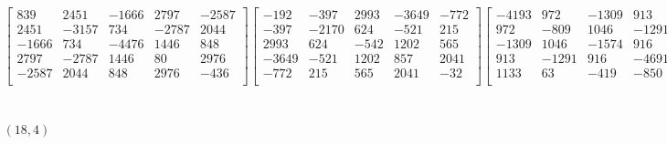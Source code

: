\documentclass[12pt]{amsart}
\theoremstyle{plain}
\theoremstyle{definition}
\begin{document}
\begin{landscape}
\begin{align*}
\begin{bmatrix}
839  &   2451  &   -1666  &   2797  &   -2587  \\ 
 2451  &   -3157  &   734  &   -2787  &   2044  \\ 
 -1666  &   734  &   -4476  &   1446  &   848  \\ 
 2797  &   -2787  &   1446  &   80  &   2976  \\ 
 -2587  &   2044  &   848  &   2976  &   -436  \\ 
\end{bmatrix}
\begin{bmatrix}
-192  &   -397  &   2993  &   -3649  &   -772  \\ 
 -397  &   -2170  &   624  &   -521  &   215  \\ 
 2993  &   624  &   -542  &   1202  &   565  \\ 
 -3649  &   -521  &   1202  &   857  &   2041  \\ 
 -772  &   215  &   565  &   2041  &   -32  \\ 
\end{bmatrix}
\begin{bmatrix}
-4193  &   972  &   -1309  &   913  &   1133  \\ 
 972  &   -809  &   1046  &   -1291  &   63  \\ 
 -1309  &   1046  &   -1574  &   916  &   -419  \\ 
 913  &   -1291  &   916  &   -4691  &   -850  \\ 
 1133  &   63  &   -419  &   -850  &   -1070  \\ 
\end{bmatrix}
\\
(18,4) &:
\begin{bmatrix}
974  &   30  &   837  &   1183  &   1069  \\ 
 30  &   -1689  &   -412  &   1980  &   -651  \\ 
 837  &   -412  &   -3553  &   -2484  &   563  \\ 
 1183  &   1980  &   -2484  &   -3904  &   -2429  \\ 
 1069  &   -651  &   563  &   -2429  &   351  \\ 
\end{bmatrix}
\begin{bmatrix}
-1113  &   1604  &   548  &   -61  &   -100  \\ 
 1604  &   -4127  &   -1509  &   -657  &   1606  \\ 
 548  &   -1509  &   -1864  &   -431  &   2058  \\ 

\end{bmatrix}
\end{align*}
\end{landscape}
\end{document}
